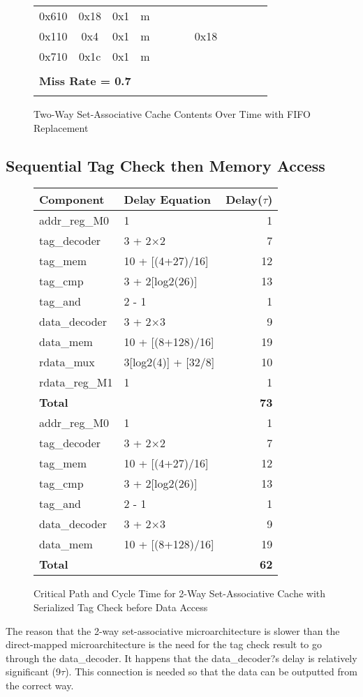 \documentclass[10pt]{article}
\begin{document}
\begin{figure}[H]
\begin{tabular}{@{\extracolsep{3pt}}cccccccccccc@{}}
0x610 & 0x18& 0x1 & m &     &     &     &     &     &     &     &     \\
0x110 & 0x4 & 0x1 & m &     &     &     & 0x18&     &     &     &     \\
0x710 & 0x1c& 0x1 & m &     &     &     &     &     &     &     &     \\
\Xhline{2\arrayrulewidth}
\multicolumn{12}{l}{\textbf{Number of Misses = 14}} \\
\hline
\multicolumn{12}{l}{\textbf{Miss Rate = 0.7}} \\
\Xhline{2\arrayrulewidth}
\end{tabular}
\caption{Two-Way Set-Associative Cache Contents Over Time with FIFO Replacement}
\end{figure}

\subsection{Sequential Tag Check then Memory Access}
\begin{figure}[H]
\centering
\begin{tabular}{@{\extracolsep{3pt}}llr@{}}
\hline
\textbf{Component} & \textbf{Delay Equation} & \textbf{Delay($\tau$)} \\
\hline
addr\_reg\_M0 & 1 & 1 \\
tag\_decoder & 3 + 2$\times$2 & 7 \\
tag\_mem 	& 10 + [(4+27)/16] & 12 \\
tag\_cmp		& 3 + 2[log2(26)] & 13 \\
tag\_and		& 2 - 1 & 1\\
data\_decoder& 3 + 2$\times$3 & 9 \\
data\_mem	& 10 + [(8+128)/16] & 19 \\
rdata\_mux	& 3[log2(4)] + [32/8] & 10 \\
rdata\_reg\_M1& 1 & 1 \\
\hline
\textbf{Total} & & \textbf{73} \\
addr\_reg\_M0 & 1 & 1 \\
tag\_decoder & 3 + 2$\times$2 & 7 \\
tag\_mem 	& 10 + [(4+27)/16] & 12 \\
tag\_cmp		& 3 + 2[log2(26)] & 13 \\
tag\_and		& 2 - 1 & 1\\
data\_decoder& 3 + 2$\times$3 & 9 \\
data\_mem	& 10 + [(8+128)/16] & 19 \\
\hline
\textbf{Total} & & \textbf{62} \\
\hline
\end{tabular}
\caption{Critical Path and Cycle Time for 2-Way Set-Associative Cache with 
\\ Serialized Tag Check before Data Access}
\end{figure}
The reason that the 2-way set-associative microarchitecture is slower than the direct-mapped microarchitecture is the need for the tag check result to go through the data\_decoder. It happens that the data\_decoder?s delay is relatively significant (9$\tau$). This connection is needed so that the data can be outputted from the correct way. 
\end{document}
